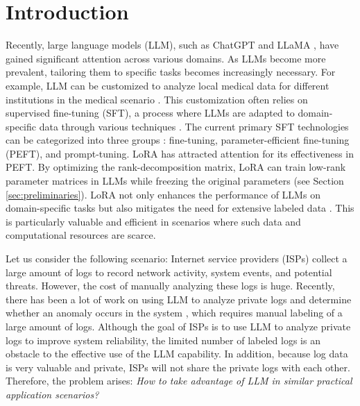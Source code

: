 \documentclass[sigconf]{acmart}
\begin{document}
\section{Introduction}
Recently, large language models (LLM), such as ChatGPT \cite{wu2023brief} and LLaMA \cite{touvron2023llama}, have gained significant attention across various domains. As LLMs become more prevalent, tailoring them to specific tasks becomes increasingly necessary. For example, LLM can be customized to analyze local medical data for different institutions in the medical scenario \cite{sheller2020federated}. This customization often relies on supervised fine-tuning (SFT), a process where LLMs are adapted to domain-specific data through various techniques \cite{kim2023efficient}. The current primary SFT technologies can be categorized into three groups \cite{wu2024fedlora}: fine-tuning, parameter-efficient fine-tuning (PEFT), and prompt-tuning.
LoRA has attracted attention for its effectiveness in PEFT. By optimizing the rank-decomposition matrix, LoRA can train low-rank parameter matrices in LLMs while freezing the original parameters (see Section \ref{sec:preliminaries}). LoRA not only enhances the performance of LLMs on domain-specific tasks but also mitigates the need for extensive labeled data \cite{hu2021lora}. This is particularly valuable and efficient in scenarios where such data and computational resources are scarce. 
\par
Let us consider the following scenario: Internet service providers (ISPs) collect a large amount of logs to record network activity, system events, and potential threats. However, the cost of manually analyzing these logs is huge. Recently, there has been a lot of work on using LLM to analyze private logs and determine whether an anomaly occurs in the system \cite{qi2023loggpt, xu2024unilog}, which requires manual labeling of a large amount of logs. Although the goal of ISPs is to use LLM to analyze private logs to improve system reliability, the limited number of labeled logs is an obstacle to the effective use of the LLM capability. In addition, because log data is very valuable and private, ISPs will not share the private logs with each other.  Therefore, the problem arises: \textit{How to take advantage of LLM in similar practical application scenarios?} 
\par
\end{document}
